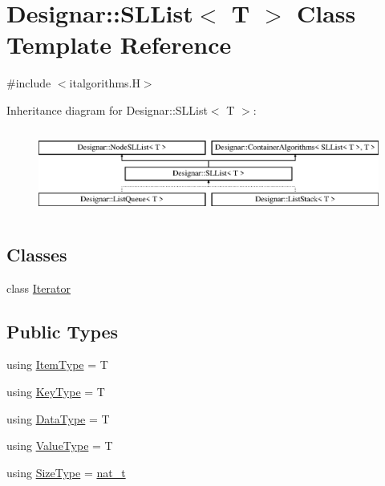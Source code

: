 \hypertarget{class_designar_1_1_s_l_list}{}\section{Designar\+:\+:S\+L\+List$<$ T $>$ Class Template Reference}
\label{class_designar_1_1_s_l_list}


{\ttfamily \#include $<$italgorithms.\+H$>$}

Inheritance diagram for Designar\+:\+:S\+L\+List$<$ T $>$\+:\begin{figure}[H]
\begin{center}
\leavevmode
\includegraphics[height=2.837838cm]{class_designar_1_1_s_l_list}
\end{center}
\end{figure}
\subsection*{Classes}
\begin{DoxyCompactItemize}
\item 
class \hyperlink{class_designar_1_1_s_l_list_1_1_iterator}{Iterator}
\end{DoxyCompactItemize}
\subsection*{Public Types}
\begin{DoxyCompactItemize}
\item 
using \hyperlink{class_designar_1_1_s_l_list_a8ec47bfb6b0d74c8f85111b7b3c05cb2}{Item\+Type} = T
\item 
using \hyperlink{class_designar_1_1_s_l_list_a0f9ac3eaee2d1a9e6091aaaac825ccb2}{Key\+Type} = T
\item 
using \hyperlink{class_designar_1_1_s_l_list_aa98659227d90b392a1b52fa5e9b292f4}{Data\+Type} = T
\item 
using \hyperlink{class_designar_1_1_s_l_list_a22813e78b0dea3a55f47d5f476fd99a1}{Value\+Type} = T
\item 
using \hyperlink{class_designar_1_1_s_l_list_a253792b5e9c19ea61fb49e5e83f6159b}{Size\+Type} = \hyperlink{namespace_designar_aa72662848b9f4815e7bf31a7cf3e33d1}{nat\+\_\+t}
\end{DoxyCompactItemize}
